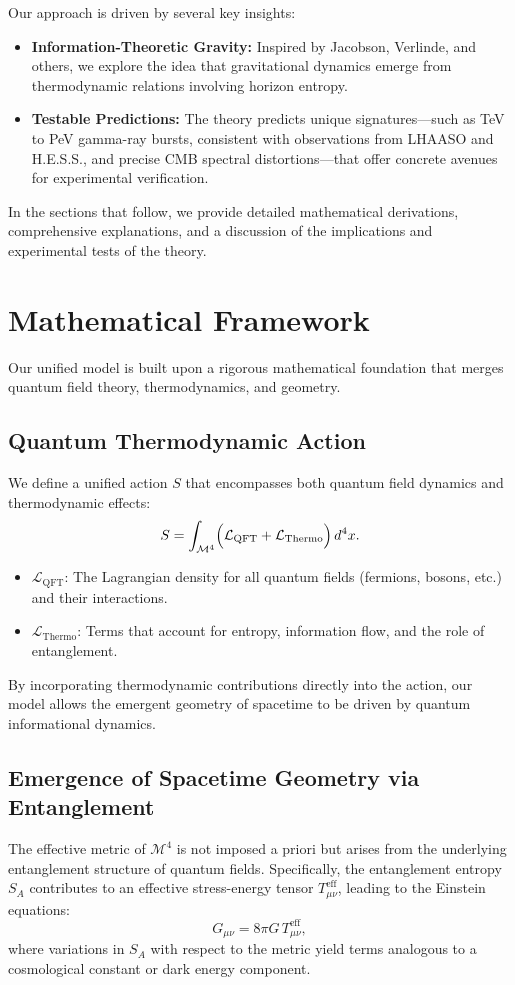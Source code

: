 \documentclass[12pt, a4paper]{article}
\begin{document}
Our approach is driven by several key insights:
\begin{itemize}
    \item \textbf{Information-Theoretic Gravity:} Inspired by Jacobson, Verlinde, and others, we explore the idea that gravitational dynamics emerge from thermodynamic relations involving horizon entropy.
    \item \textbf{Testable Predictions:} The theory predicts unique signatures—such as TeV to PeV gamma-ray bursts, consistent with observations from LHAASO and H.E.S.S., and precise CMB spectral distortions—that offer concrete avenues for experimental verification.
\end{itemize}

In the sections that follow, we provide detailed mathematical derivations, comprehensive explanations, and a discussion of the implications and experimental tests of the theory.

\section{Mathematical Framework}
Our unified model is built upon a rigorous mathematical foundation that merges quantum field theory, thermodynamics, and geometry.

\subsection{Quantum Thermodynamic Action}
We define a unified action $S$ that encompasses both quantum field dynamics and thermodynamic effects:
\begin{equation}
    S = \int_{\mathcal{M}^{4}} \Bigl( \mathcal{L}_{\text{QFT}} + \mathcal{L}_{\text{Thermo}} \Bigr) \, d^{4}x.
\end{equation}
\begin{itemize}
    \item $\mathcal{L}_{\text{QFT}}$: The Lagrangian density for all quantum fields (fermions, bosons, etc.) and their interactions.
    \item $\mathcal{L}_{\text{Thermo}}$: Terms that account for entropy, information flow, and the role of entanglement.
\end{itemize}
By incorporating thermodynamic contributions directly into the action, our model allows the emergent geometry of spacetime to be driven by quantum informational dynamics.

\subsection{Emergence of Spacetime Geometry via Entanglement}
The effective metric of $\mathcal{M}^4$ is not imposed a priori but arises from the underlying entanglement structure of quantum fields. Specifically, the entanglement entropy $S_A$ contributes to an effective stress-energy tensor $T_{\mu\nu}^{\text{eff}}$, leading to the Einstein equations:
\begin{equation}
    G_{\mu\nu} = 8\pi G\, T_{\mu\nu}^{\text{eff}},
\end{equation}
where variations in $S_A$ with respect to the metric yield terms analogous to a cosmological constant or dark energy component.
\end{document}
